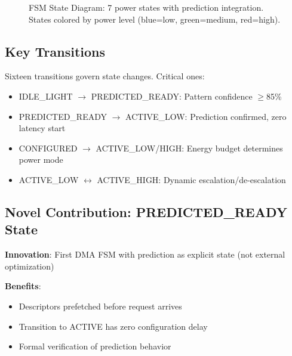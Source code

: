 \documentclass[conference]{IEEEtran}
\begin{document}
\begin{figure}[h]
{
}
\caption{FSM State Diagram: 7 power states with prediction integration. States colored by power level (blue=low, green=medium, red=high).}
\label{fig:fsm}
\end{figure}

\subsection{Key Transitions}
Sixteen transitions govern state changes. Critical ones:
\begin{itemize}
    \item IDLE\_LIGHT $\rightarrow$ PREDICTED\_READY: Pattern confidence $\geq$85\%
    \item PREDICTED\_READY $\rightarrow$ ACTIVE\_LOW: Prediction confirmed, zero latency start
    \item CONFIGURED $\rightarrow$ ACTIVE\_LOW/HIGH: Energy budget determines power mode
    \item ACTIVE\_LOW $\leftrightarrow$ ACTIVE\_HIGH: Dynamic escalation/de-escalation
\end{itemize}

\subsection{Novel Contribution: PREDICTED\_READY State}
\textbf{Innovation}: First DMA FSM with prediction as explicit state (not external optimization)

\textbf{Benefits}:
\begin{itemize}
    \item Descriptors prefetched before request arrives
    \item Transition to ACTIVE has zero configuration delay
    \item Formal verification of prediction behavior
\end{itemize}
\end{document}
